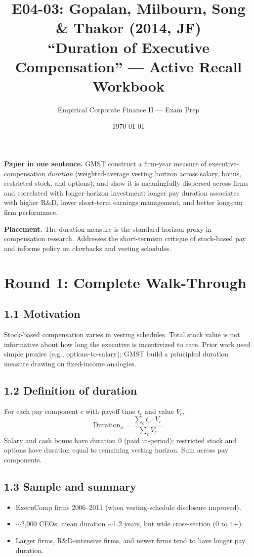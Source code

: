 \documentclass[11pt]{article}
\title{E04-03: Gopalan, Milbourn, Song \& Thakor (2014, JF) \\
\large ``Duration of Executive Compensation'' --- Active Recall Workbook}
\author{Empirical Corporate Finance II --- Exam Prep}
\date{\today}
\begin{document}
\maketitle

\begin{keybox}
\textbf{Paper in one sentence.} GMST construct a firm-year measure of executive-compensation \emph{duration} (weighted-average vesting horizon across salary, bonus, restricted stock, and options), and show it is meaningfully dispersed across firms and correlated with longer-horizon investment: longer pay duration associates with higher R\&D, lower short-term earnings management, and better long-run firm performance.

\textbf{Placement.} The duration measure is the standard horizon-proxy in compensation research. Addresses the short-termism critique of stock-based pay and informs policy on clawbacks and vesting schedules.
\end{keybox}

\section*{Round 1: Complete Walk-Through}

\subsection*{1.1 Motivation}
Stock-based compensation varies in vesting schedules. Total stock value is not informative about how long the executive is incentivized to care. Prior work used simple proxies (e.g., options-to-salary); GMST build a principled duration measure drawing on fixed-income analogies.

\subsection*{1.2 Definition of duration}
For each pay component $c$ with payoff time $t_c$ and value $V_c$,
\[
\text{Duration}_{it} = \frac{\sum_c t_c \cdot V_c}{\sum_c V_c}.
\]
Salary and cash bonus have duration 0 (paid in-period); restricted stock and options have duration equal to remaining vesting horizon. Sum across pay components.

\subsection*{1.3 Sample and summary}
\begin{itemize}
\item ExecuComp firms 2006--2011 (when vesting-schedule disclosure improved).
\item $\sim$2,000 CEOs; mean duration $\sim$1.2 years, but wide cross-section (0 to 4+).
\item Larger firms, R\&D-intensive firms, and newer firms tend to have longer pay duration.
\end{itemize}
\end{document}
